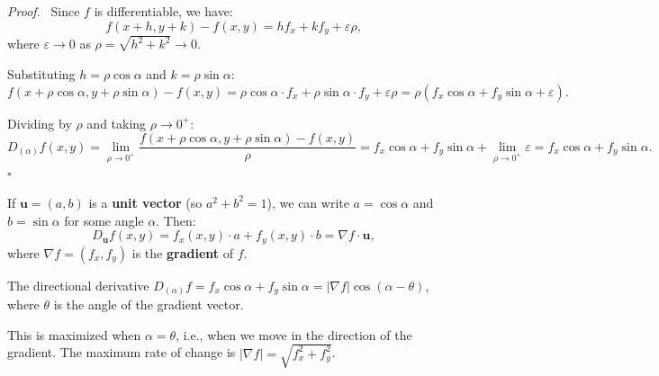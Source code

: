 \documentclass[11pt]{report}
\renewenvironment{proof}[1][Proof]{\par\noindent\textit{#1.}\ }{\hfill$\square$\par\medskip}
\begin{document}
\begin{proof}
Since $f$ is differentiable, we have:
\[
f(x + h, y + k) - f(x, y) = h f_x + k f_y + \varepsilon \rho,
\]
where $\varepsilon \to 0$ as $\rho = \sqrt{h^2 + k^2} \to 0$.

Substituting $h = \rho \cos \alpha$ and $k = \rho \sin \alpha$:
\[
f(x + \rho \cos \alpha, y + \rho \sin \alpha) - f(x, y) = \rho \cos \alpha \cdot f_x + \rho \sin \alpha \cdot f_y + \varepsilon \rho = \rho (f_x \cos \alpha + f_y \sin \alpha + \varepsilon).
\]

Dividing by $\rho$ and taking $\rho \to 0^+$:
\[
D_{(\alpha)} f(x, y) = \lim_{\rho \to 0^+} \frac{f(x + \rho \cos \alpha, y + \rho \sin \alpha) - f(x, y)}{\rho} = f_x \cos \alpha + f_y \sin \alpha + \lim_{\rho \to 0^+} \varepsilon = f_x \cos \alpha + f_y \sin \alpha.
\]
\end{proof}

\begin{remark}
If $\mathbf{u} = (a, b)$ is a \textbf{unit vector} (so $a^2 + b^2 = 1$), we can write $a = \cos \alpha$ and $b = \sin \alpha$ for some angle $\alpha$. Then:
\[
D_{\mathbf{u}} f(x, y) = f_x(x, y) \cdot a + f_y(x, y) \cdot b = \nabla f \cdot \mathbf{u},
\]
where $\nabla f = (f_x, f_y)$ is the \textbf{gradient} of $f$.
\end{remark}

\begin{remark}
The directional derivative $D_{(\alpha)} f = f_x \cos \alpha + f_y \sin \alpha = |\nabla f| \cos(\alpha - \theta)$, where $\theta$ is the angle of the gradient vector.

This is maximized when $\alpha = \theta$, i.e., when we move in the direction of the gradient. The maximum rate of change is $|\nabla f| = \sqrt{f_x^2 + f_y^2}$.
\end{remark}
\end{document}
